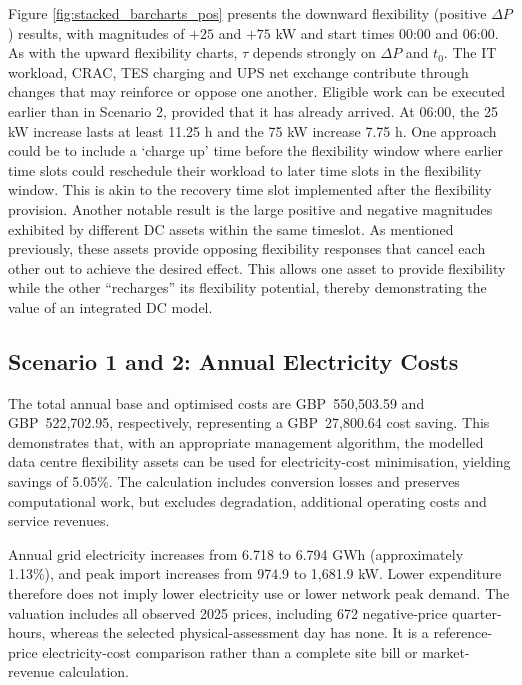 \documentclass[lettersize,journal]{IEEEtran}
\newcommand{\rev}[1]{#1}
\begin{document}
\rev{Figure \ref{fig:stacked_barcharts_pos} presents the downward flexibility (positive $\Delta P$) results, with magnitudes of $+25$ and $+75$ kW and start times 00:00 and 06:00.} As  with the upward flexibility charts, $\tau$ depends strongly on  $\Delta P$ and $t_0$. The IT workload, CRAC, TES charging and UPS net exchange contribute through changes that may reinforce or oppose one another. Eligible work can be executed earlier than in Scenario 2, provided that it has already arrived. At 06:00, the 25 kW increase lasts at least 11.25 h and the 75 kW increase 7.75 h. One approach could be to include a `charge up' time before the flexibility window where earlier time slots could reschedule their workload to later time slots in the flexibility window. This is akin to the recovery time slot implemented after the flexibility provision. Another notable result is the large positive and negative magnitudes exhibited by different DC assets within the same timeslot. As mentioned previously, these assets provide opposing flexibility responses that cancel each other out to achieve the desired effect. This allows one asset to provide flexibility while the other ``recharges'' its flexibility potential, thereby demonstrating the value of an integrated DC model.

\subsection{Scenario 1 and 2: Annual Electricity Costs}
\rev{The total annual base and optimised costs are GBP~550,503.59 and GBP~522,702.95, respectively, representing a GBP~27,800.64 cost saving. This demonstrates that, with an appropriate management algorithm, the modelled data centre flexibility assets can be used for electricity-cost minimisation, yielding savings of 5.05\%. The calculation includes conversion losses and preserves computational work, but excludes degradation, additional operating costs and service revenues.}

Annual grid electricity increases from 6.718 to 6.794 GWh (approximately 1.13\%), and peak import increases from 974.9 to 1,681.9 kW. Lower expenditure therefore does not imply lower electricity use or lower network peak demand. The valuation includes all observed 2025 prices, including 672 negative-price quarter-hours, whereas the selected physical-assessment day has none. It is a reference-price electricity-cost comparison rather than a complete site bill or market-revenue calculation.
\end{document}
